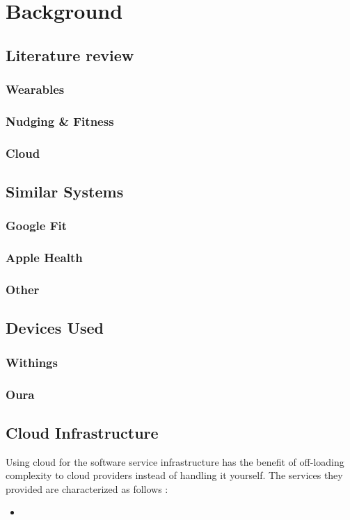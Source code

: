 \chapter{Background}
\label{cha:background}
\section{Literature review}
\subsection{Wearables}
\subsection{Nudging \& Fitness}
\subsection{Cloud}
\section{Similar Systems}
\label{section:similarSystems}
\subsection{Google Fit}
\subsection{Apple Health}
\subsection{Other}
\section{Devices Used}
\subsection{Withings}
\subsection{Oura}
\section{Cloud Infrastructure}
Using cloud for the software service infrastructure has the benefit of off-loading complexity to cloud providers instead of handling it yourself. The services they provided are characterized as follows \cite{cloudServicesCategories}: 
\begin{itemize}
    \item 
\end{itemize}
